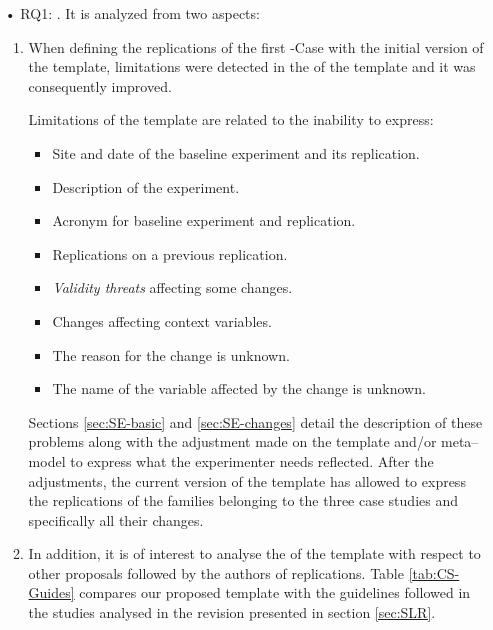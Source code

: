\begin{itemize}
    \item[•] RQ1: \emph{\Expressiveness}. It is analyzed from two aspects:
	
	\begin{enumerate}
        \item  When defining the replications of the first \SoftEng-Case with the initial version of the template, limitations were detected in the \emph{\expressiveness} of the template and it was consequently improved.
	
        Limitations of the template are related to the inability to express: 
    
        \begin{itemize}
	        \item Site and date of the baseline experiment and its replication.
	        \item Description of the experiment.
	        \item Acronym for baseline experiment and replication.
	        \item Replications on a previous replication.
	        \item \emph{Validity threats} affecting some changes.
	        \item Changes affecting context variables.
	        \item The reason for the change is unknown.
	        \item The name of the variable affected by the change is unknown.
        \end{itemize}

    Sections \ref{sec:SE-basic} and \ref{sec:SE-changes} detail the description of these problems along with the adjustment made on the template and/or meta--model to express what the experimenter needs reflected. 
    After the adjustments, the current version of the template has allowed to express the replications of the families belonging to the three case studies and specifically all their changes. 


    \item In addition, it is of interest to analyse the \emph{\expressiveness} of the template with respect to other proposals followed by the authors of replications. Table \ref{tab:CS-Guides} compares our proposed template with the guidelines followed in the studies analysed in the revision presented in section \ref{sec:SLR}. \\
    

\end{enumerate}
\end{itemize}
